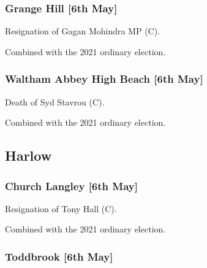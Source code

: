 \documentclass[a4paper,openany]{book}
\begin{document}
\begin{resultsiii}
\subsubsection*{Grange Hill \hspace*{\fill}\nolinebreak[1]%
	\enspace\hspace*{\fill}
	[6th May]}


Resignation of Gagan Mohindra MP (C).

Combined with the 2021 ordinary election.

\subsubsection*{Waltham Abbey High Beach \hspace*{\fill}\nolinebreak[1]%
	\enspace\hspace*{\fill}
	[6th May]}


Death of Syd Stavrou (C).

Combined with the 2021 ordinary election.

\subsection*{Harlow}

\subsubsection*{Church Langley \hspace*{\fill}\nolinebreak[1]%
	\enspace\hspace*{\fill}
	[6th May]}


Resignation of Tony Hall (C).

Combined with the 2021 ordinary election.

\subsubsection*{Toddbrook \hspace*{\fill}\nolinebreak[1]%
	\enspace\hspace*{\fill}
	[6th May]}


\end{resultsiii}
\end{document}
